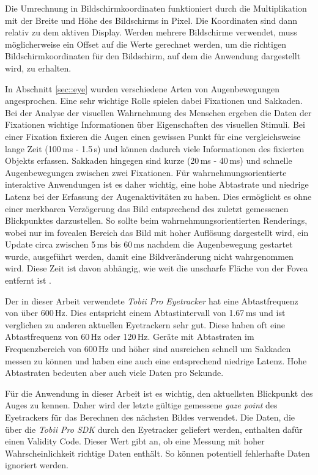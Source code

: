 Die Umrechnung in Bildschirmkoordinaten funktioniert durch die Multiplikation mit der Breite und Höhe des Bildschirms in Pixel.
Die Koordinaten sind dann relativ zu dem aktiven Display.
Werden mehrere Bildschirme verwendet, muss möglicherweise ein Offset auf die Werte gerechnet werden, um die richtigen Bildschirmkoordinaten für den Bildschirm, auf dem die Anwendung dargestellt wird, zu erhalten.

In Abschnitt \ref{sec::eye} wurden verschiedene Arten von Augenbewegungen angesprochen.
Eine sehr wichtige Rolle spielen dabei Fixationen und Sakkaden.
Bei der Analyse der visuellen Wahrnehmung des Menschen ergeben die Daten der Fixationen wichtige Informationen über Eigenschaften des visuellen Stimuli.
Bei einer Fixation fixieren die Augen einen gewissen Punkt für eine vergleichsweise lange Zeit (100\,ms - 1.5\,s) und können dadurch viele Informationen des fixierten Objekts erfassen.
Sakkaden hingegen sind kurze (20\,ms - 40\,ms) und schnelle Augenbewegungen zwischen zwei Fixationen.
Für wahrnehmungsorientierte interaktive Anwendungen ist es daher wichtig, eine hohe Abtastrate und niedrige Latenz bei der Erfassung der Augenaktivitäten zu haben.
Dies ermöglicht es ohne einer merkbaren Verzögerung das Bild entsprechend des zuletzt gemessenen Blickpunktes darzustellen.
So sollte beim wahrnehmungsorientierten Renderings, wobei nur im fovealen Bereich das Bild mit hoher Auflösung dargestellt wird, ein Update circa zwischen 5\,ms bis 60\,ms nachdem die Augenbewegung gestartet wurde, ausgeführt werden, damit eine Bildveränderung nicht wahrgenommen wird.
Diese Zeit ist davon abhängig, wie weit die unscharfe Fläche von der Fovea entfernt ist \cite{doi:10.1111/cgf.13150}.

Der in dieser Arbeit verwendete \emph{Tobii Pro Eyetracker} hat eine Abtastfrequenz von über 600\,Hz.
Dies entspricht einem Abtastintervall von 1.67\,ms und ist verglichen zu anderen aktuellen Eyetrackern sehr gut.
Diese haben oft eine Abtastfrequenz von 60\,Hz oder 120\,Hz.
Geräte mit Abtastraten im Frequenzbereich von 600\,Hz und höher sind ausreichen schnell um Sakkaden messen zu können und haben eine auch eine entsprechend niedrige Latenz.
Hohe Abtastraten bedeuten aber auch viele Daten pro Sekunde.

Für die Anwendung in dieser Arbeit ist es wichtig, den aktuellsten Blickpunkt des Auges zu kennen.
Daher wird der letzte gültige gemessene \emph{gaze point} des Eyetrackers für das Berechnen des nächsten Bildes verwendet.
Die Daten, die über die \emph{Tobii Pro SDK} durch den Eyetracker geliefert werden, enthalten dafür einen Validity Code.
Dieser Wert gibt an, ob eine Messung mit hoher Wahrscheinlichkeit richtige Daten enthält.
So können potentiell fehlerhafte Daten ignoriert werden.

